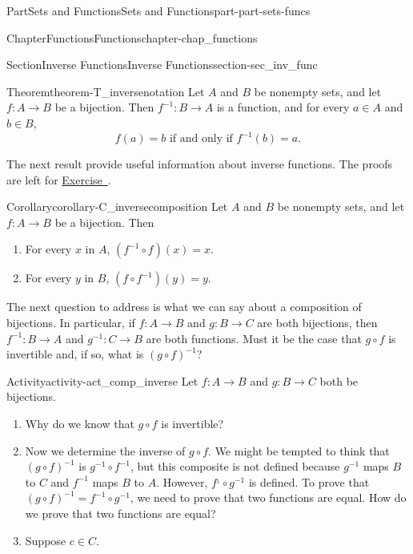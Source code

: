 \documentclass[oneside,10pt,]{book}
\newcommand{\xreffont}{\relax}
\numberwithin{equation}{chapter}
\begin{document}
\begin{partptx}{Part}{Sets and Functions}{}{Sets and Functions}{}{}{part-part-sets-funcs}
\begin{chapterptx}{Chapter}{Functions}{}{Functions}{}{}{chapter-chap_functions}
\begin{sectionptx}{Section}{Inverse Functions}{}{Inverse Functions}{}{}{section-sec_inv_func}
\begin{theorem}{Theorem}{}{}{theorem-T_inversenotation}%
Let \(A\) and \(B\) be nonempty sets, and let \(f: A \to B\) be a bijection. Then \(f^{ - 1} : B \to A\) is a function, and for every \(a \in A\) and \(b \in B\),%
\begin{equation*}
f( a ) = b  \text{ if and only if }  f^{ - 1} ( b ) = a\text{.}
\end{equation*}
%
\end{theorem}
The next result provide useful information about inverse functions. The proofs are left for \hyperlink{exercise-ex_inverse_composite}{Exercise~{\xreffont 8}}.%
\begin{corollary}{Corollary}{}{}{corollary-C_inversecomposition}%
Let \(A\) and \(B\) be nonempty sets, and let \(f: A \to B\) be a bijection. Then%
\begin{enumerate}
\item\hypertarget{li-C_inversecomposition1}{}For every \(x\) in \(A\), \(\left( f^{ - 1} \circ f \right)(x) = x\).%
\item\hypertarget{li-C_inversecomposition2}{}For every \(y\) in \(B\), \(\left( f \circ f^{ - 1}\right)(y) = y\).%
\end{enumerate}
%
\end{corollary}
The next question to address is what we can say about a composition of bijections. In particular, if \(f: A \to B\) and \(g: B \to C\) are both bijections, then \(f^{ - 1} : B \to A\) and \(g^{ - 1} : C \to B\) are both functions. Must it be the case that \(g \circ f\) is invertible and, if so, what is \((g \circ f)^{-1}\)?%
\begin{activity}{Activity}{}{activity-act_comp_inverse}%
Let \(f: A \to B\) and \(g: B \to C\) both be bijections.%
\begin{enumerate}[font=\bfseries,label=(\alph*),ref=\alph*]%
\item{}Why do we know that \(g \circ f\) is invertible?%
\item{}Now we determine the inverse of \(g \circ f\). We might be tempted to think that \((g \circ f)^{-1}\) is \(g^{-1} \circ f^{-1}\), but this composite is not defined because \(g^{-1}\) maps \(B\) to \(C\) and \(f^{-1}\) maps \(B\) to \(A\). However, \(f^{_1} \circ g^{-1}\) is defined. To prove that \((g \circ f)^{-1} = f^{-1} \circ g^{-1}\), we need to prove that two functions are equal. How do we prove that two functions are equal?%
\item{}Suppose \(c \in C\).%
\begin{enumerate}[font=\bfseries,label=(\roman*),ref=\theenumi.\roman*]%

\end{enumerate}
\end{enumerate}
\end{activity}
\end{sectionptx}
\end{chapterptx}
\end{partptx}
\end{document}
